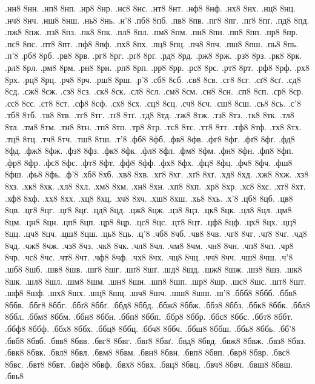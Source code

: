 {.нн8
8нн.
.нп8
8нп.
.нр8
8нр.
.нс8
8нс.
.нт8
8нт.
.нф8
8нф.
.нх8
8нх.
.нц8
8нц.
.нч8
8нч.
.нш8
8нш.
.нь8
8нь.
.н'8
.пб8
8пб.
.пв8
8пв.
.пг8
8пг.
.пґ8
8пґ.
.пд8
8пд.
.пж8
8пж.
.пз8
8пз.
.пк8
8пк.
.пл8
8пл.
.пм8
8пм.
.пн8
8пн.
.пп8
8пп.
.пр8
8пр.
.пс8
8пс.
.пт8
8пт.
.пф8
8пф.
.пх8
8пх.
.пц8
8пц.
.пч8
8пч.
.пш8
8пш.
.пь8
8пь.
.п'8
.рб8
8рб.
.рв8
8рв.
.рг8
8рг.
.рґ8
8рґ.
.рд8
8рд.
.рж8
8рж.
.рз8
8рз.
.рк8
8рк.
.рл8
8рл.
.рм8
8рм.
.рн8
8рн.
.рп8
8рп.
.рр8
8рр.
.рс8
8рс.
.рт8
8рт.
.рф8
8рф.
.рх8
8рх.
.рц8
8рц.
.рч8
8рч.
.рш8
8рш.
.р'8
.сб8
8сб.
.св8
8св.
.сг8
8сг.
.сґ8
8сґ.
.сд8
8сд.
.сж8
8сж.
.сз8
8сз.
.ск8
8ск.
.сл8
8сл.
.см8
8см.
.сн8
8сн.
.сп8
8сп.
.ср8
8ср.
.сс8
8сс.
.ст8
8ст.
.сф8
8сф.
.сх8
8сх.
.сц8
8сц.
.сч8
8сч.
.сш8
8сш.
.сь8
8сь.
.с'8
.тб8
8тб.
.тв8
8тв.
.тг8
8тг.
.тґ8
8тґ.
.тд8
8тд.
.тж8
8тж.
.тз8
8тз.
.тк8
8тк.
.тл8
8тл.
.тм8
8тм.
.тн8
8тн.
.тп8
8тп.
.тр8
8тр.
.тс8
8тс.
.тт8
8тт.
.тф8
8тф.
.тх8
8тх.
.тц8
8тц.
.тч8
8тч.
.тш8
8тш.
.т'8
.фб8
8фб.
.фв8
8фв.
.фг8
8фг.
.фґ8
8фґ.
.фд8
8фд.
.фж8
8фж.
.фз8
8фз.
.фк8
8фк.
.фл8
8фл.
.фм8
8фм.
.фн8
8фн.
.фп8
8фп.
.фр8
8фр.
.фс8
8фс.
.фт8
8фт.
.фф8
8фф.
.фх8
8фх.
.фц8
8фц.
.фч8
8фч.
.фш8
8фш.
.фь8
8фь.
.ф'8
.хб8
8хб.
.хв8
8хв.
.хг8
8хг.
.хґ8
8хґ.
.хд8
8хд.
.хж8
8хж.
.хз8
8хз.
.хк8
8хк.
.хл8
8хл.
.хм8
8хм.
.хн8
8хн.
.хп8
8хп.
.хр8
8хр.
.хс8
8хс.
.хт8
8хт.
.хф8
8хф.
.хх8
8хх.
.хц8
8хц.
.хч8
8хч.
.хш8
8хш.
.хь8
8хь.
.х'8
.цб8
8цб.
.цв8
8цв.
.цг8
8цг.
.цґ8
8цґ.
.цд8
8цд.
.цж8
8цж.
.цз8
8цз.
.цк8
8цк.
.цл8
8цл.
.цм8
8цм.
.цн8
8цн.
.цп8
8цп.
.цр8
8цр.
.цс8
8цс.
.цт8
8цт.
.цф8
8цф.
.цх8
8цх.
.цц8
8цц.
.цч8
8цч.
.цш8
8цш.
.ць8
8ць.
.ц'8
.чб8
8чб.
.чв8
8чв.
.чг8
8чг.
.чґ8
8чґ.
.чд8
8чд.
.чж8
8чж.
.чз8
8чз.
.чк8
8чк.
.чл8
8чл.
.чм8
8чм.
.чн8
8чн.
.чп8
8чп.
.чр8
8чр.
.чс8
8чс.
.чт8
8чт.
.чф8
8чф.
.чх8
8чх.
.чц8
8чц.
.чч8
8чч.
.чш8
8чш.
.ч'8
.шб8
8шб.
.шв8
8шв.
.шг8
8шг.
.шґ8
8шґ.
.шд8
8шд.
.шж8
8шж.
.шз8
8шз.
.шк8
8шк.
.шл8
8шл.
.шм8
8шм.
.шн8
8шн.
.шп8
8шп.
.шр8
8шр.
.шс8
8шс.
.шт8
8шт.
.шф8
8шф.
.шх8
8шх.
.шц8
8шц.
.шч8
8шч.
.шш8
8шш.
.ш'8
.ббб8
8ббб.
.ббв8
8ббв.
.ббг8
8ббг.
.ббґ8
8ббґ.
.ббд8
8ббд.
.ббж8
8ббж.
.ббз8
8ббз.
.ббк8
8ббк.
.ббл8
8ббл.
.ббм8
8ббм.
.ббн8
8ббн.
.ббп8
8ббп.
.ббр8
8ббр.
.ббс8
8ббс.
.ббт8
8ббт.
.ббф8
8ббф.
.ббх8
8ббх.
.ббц8
8ббц.
.ббч8
8ббч.
.ббш8
8ббш.
.ббь8
8ббь.
.бб'8
.бвб8
8бвб.
.бвв8
8бвв.
.бвг8
8бвг.
.бвґ8
8бвґ.
.бвд8
8бвд.
.бвж8
8бвж.
.бвз8
8бвз.
.бвк8
8бвк.
.бвл8
8бвл.
.бвм8
8бвм.
.бвн8
8бвн.
.бвп8
8бвп.
.бвр8
8бвр.
.бвс8
8бвс.
.бвт8
8бвт.
.бвф8
8бвф.
.бвх8
8бвх.
.бвц8
8бвц.
.бвч8
8бвч.
.бвш8
8бвш.
.бвь8
}

